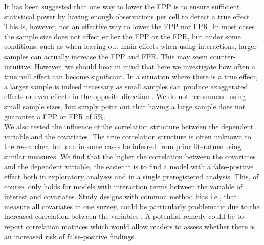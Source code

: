 It has been suggested that one way to lower the FPP is to ensure sufficient statistical power by having enough observations per cell to detect a true effect \citep{Simmons2011, simmons2018}. This is, however, not an effective way to lower the FPP nor FPR. In most cases the sample size does not affect either the FPP or the FPR, but under some conditions, such as when leaving out main effects when using interactions, larger samples can actually increase the FPP and FPR. This may seem counter-intuitive. However, we should bear in mind that here we investigate how often a true null effect can become significant. In a situation where there is a true effect, a larger sample is indeed necessary as small samples can produce exaggerated effects or even effects in the opposite direction \citep{gelman2014beyond}. We do not recommend using small sample sizes, but simply point out that having a large sample does not guarantee a FPP or FPR of 5\%. \\

We also tested the influence of the correlation structure between the dependent variable and the covariates. The true correlation structure is often unknown to the researcher, but can in some cases be inferred from prior literature using similar measures. We find that the higher the correlation between the covariates and the dependent variable, the easier it is to find a model with a false-positive effect both in exploratory analyses and in a single preregistered analysis. This, of course, only holds for models with interaction terms between the variable of interest and covariates. Study designs with common method bias i.e., that measure all covariates in one survey, could be particularly problematic due to the increased correlation between the variables \citep{podsakoff2003}. A potential remedy could be to report correlation matrices which would allow readers to assess whether there is an increased risk of false-positive findings.  \\ 

